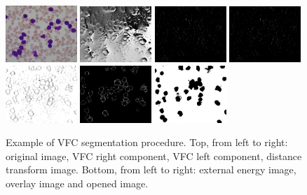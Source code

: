 \documentclass[final,a4paper,12pt,english]{UnicaPhdThesis3}
\begin{document}
\begin{figure}[h]
	\centering
	\hspace{-1.5mm}\includegraphics[width=0.24\textwidth]{images/2018_1_visapp/015_1}\vspace{1 mm}
	\includegraphics[width=0.24\textwidth]{images/2018_1_visapp/figure2}
	\includegraphics[width=0.24\textwidth]{images/2018_1_visapp/figure3}
	\includegraphics[width=0.24\textwidth]{images/2018_1_visapp/figure3}
	\includegraphics[width=0.24\textwidth]{images/2018_1_visapp/figure4}
	\includegraphics[width=0.24\textwidth]{images/2018_1_visapp/figure5}
	\includegraphics[width=0.24\textwidth]{images/2018_1_visapp/figure7}
	\caption{\label{fig:vfc1}Example of VFC segmentation procedure. Top, from left to right: original image, VFC right component, VFC left component, distance transform image. Bottom, from left to right: external energy image, overlay image and opened image.}
\end{figure}
\end{document}
